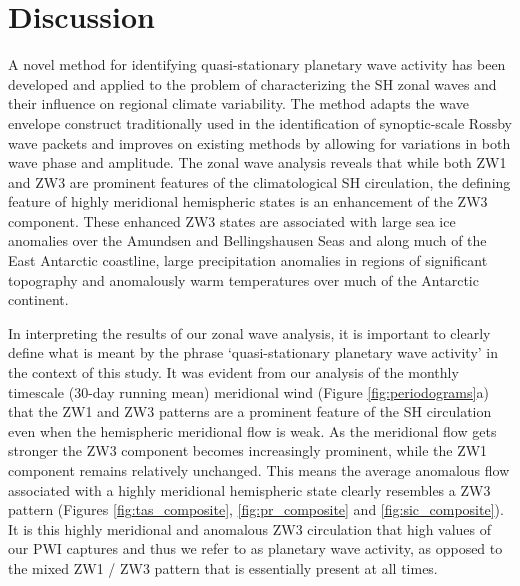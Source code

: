 \section{Discussion}

A novel method for identifying quasi-stationary planetary wave activity has been developed and applied to the problem of characterizing the SH zonal waves and their influence on regional climate variability. The method adapts the wave envelope construct traditionally used in the identification of synoptic-scale Rossby wave packets and improves on existing methods by allowing for variations in both wave phase and amplitude. The zonal wave analysis reveals that while both ZW1 and ZW3 are prominent features of the climatological SH circulation, the defining feature of highly meridional hemispheric states is an enhancement of the ZW3 component. These enhanced ZW3 states are associated with large sea ice anomalies over the Amundsen and Bellingshausen Seas and along much of the East Antarctic coastline, large precipitation anomalies in regions of significant topography and anomalously warm temperatures over much of the Antarctic continent. 

In interpreting the results of our zonal wave analysis, it is important to clearly define what is meant by the phrase `quasi-stationary planetary wave activity' in the context of this study. It was evident from our analysis of the monthly timescale (30-day running mean) meridional wind  (Figure \ref{fig:periodograms}a) that the ZW1 and ZW3 patterns are a prominent feature of the SH circulation even when the hemispheric meridional flow is weak. As the meridional flow gets stronger the ZW3 component becomes increasingly prominent, while the ZW1 component remains relatively unchanged. This means the average anomalous flow associated with a highly meridional hemispheric state clearly resembles a ZW3 pattern (Figures \ref{fig:tas_composite}, \ref{fig:pr_composite} and \ref{fig:sic_composite}). It is this highly meridional and anomalous ZW3 circulation that high values of our PWI captures and thus we refer to as planetary wave activity, as opposed to the mixed ZW1 / ZW3 pattern that is essentially present at all times.  

